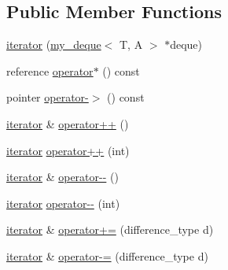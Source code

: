 \subsection*{Public Member Functions}
\begin{DoxyCompactItemize}
\item 
\hyperlink{classmy__deque_1_1iterator_a1faf06f98712999aa0bd64b1270cf27d}{iterator} (\hyperlink{classmy__deque}{my\-\_\-deque}$<$ T, A $>$ $\ast$deque)
\item 
reference \hyperlink{classmy__deque_1_1iterator_a12632f02814bba64ca79f42edc0e1497}{operator$\ast$} () const 
\item 
pointer \hyperlink{classmy__deque_1_1iterator_a064f5b1faf5a72113083425133de9a41}{operator-\/$>$} () const 
\item 
\hyperlink{classmy__deque_1_1iterator}{iterator} \& \hyperlink{classmy__deque_1_1iterator_ab2a00619614e204eedb184112a56016e}{operator++} ()
\item 
\hyperlink{classmy__deque_1_1iterator}{iterator} \hyperlink{classmy__deque_1_1iterator_a57f6ac4aef7215ca67b6e05eeda29ee4}{operator++} (int)
\item 
\hyperlink{classmy__deque_1_1iterator}{iterator} \& \hyperlink{classmy__deque_1_1iterator_a278cab96c03498e55ba1aa4e05f1538e}{operator-\/-\/} ()
\item 
\hyperlink{classmy__deque_1_1iterator}{iterator} \hyperlink{classmy__deque_1_1iterator_a5bef4b6332aecf7dcda57cee9a1fdc70}{operator-\/-\/} (int)
\item 
\hyperlink{classmy__deque_1_1iterator}{iterator} \& \hyperlink{classmy__deque_1_1iterator_ad17b4f6e8be4d8242ad4572d62beff82}{operator+=} (difference\-\_\-type d)
\item 
\hyperlink{classmy__deque_1_1iterator}{iterator} \& \hyperlink{classmy__deque_1_1iterator_a13c056d48543734a23a9de09fd652868}{operator-\/=} (difference\-\_\-type d)
\end{DoxyCompactItemize}
